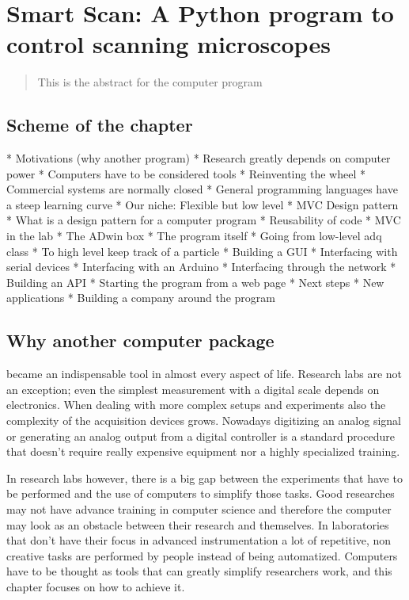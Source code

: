 \chapter[Smart Scan]{Smart Scan: A Python program to control scanning
microscopes}
\label{ch:SmartScan}

\begin{abstract}
This is the abstract for the computer program
\end{abstract}

\newpage

\section{Scheme of the chapter}
* Motivations (why another program)
  * Research greatly depends on computer power
  * Computers have to be considered tools
  * Reinventing the wheel
  * Commercial systems are normally closed
  * General programming languages have a steep learning curve
  * Our niche: Flexible but low level
* MVC Design pattern
  * What is a design pattern for a computer program
  * Reusability of code
  * MVC in the lab
  * The ADwin box
* The program itself
  * Going from low-level adq class
  * To high level keep track of a particle
  * Building a GUI
  * Interfacing with serial devices
  * Interfacing with an Arduino
  * Interfacing through the network
  * Building an API
  * Starting the program from a web page
* Next steps
  * New applications
  * Building a company around the program


\section{Why another computer package}
 became an indispensable tool in almost every aspect of
life. Research labs are not an exception; even the simplest measurement with a
digital scale depends on electronics. When dealing with more complex setups and
experiments also the complexity of the acquisition devices grows. Nowadays
digitizing an analog signal or generating an analog output from a digital
controller is a standard procedure that doesn't require really expensive
equipment nor a highly specialized training.

In research labs however, there is a big gap between the experiments that have
to be performed and the use of computers to simplify those tasks. Good
researches may not have advance training in computer science and therefore the
computer may look as an obstacle between their research and themselves. In
laboratories that don't have their focus in advanced instrumentation a lot of
repetitive, non creative tasks are performed by people instead of being
automatized. Computers have to be thought as tools that can greatly simplify 
researchers work, and this chapter focuses on how to achieve it. 

